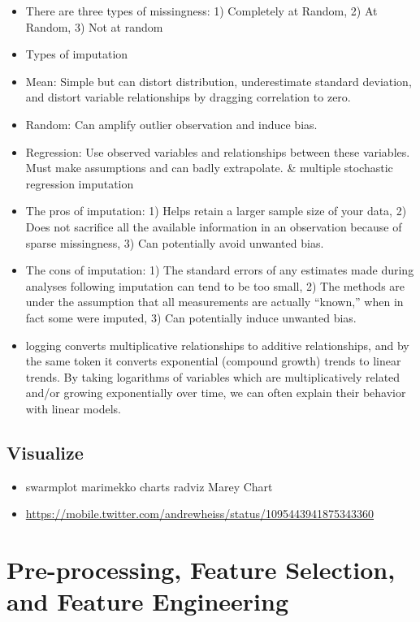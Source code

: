 \documentclass[]{book}
\begin{document}
\begin{itemize}
\item
  There are three types of missingness: 1) Completely at Random, 2) At
  Random, 3) Not at random
\item
  Types of imputation
\item
  Mean: Simple but can distort distribution, underestimate standard
  deviation, and distort variable relationships by dragging correlation
  to zero.
\item
  Random: Can amplify outlier observation and induce bias.
\item
  Regression: Use observed variables and relationships between these
  variables. Must make assumptions and can badly extrapolate. \&
  multiple stochastic regression imputation
\item
  The pros of imputation: 1) Helps retain a larger sample size of your
  data, 2) Does not sacrifice all the available information in an
  observation because of sparse missingness, 3) Can potentially avoid
  unwanted bias.
\item
  The cons of imputation: 1) The standard errors of any estimates made
  during analyses following imputation can tend to be too small, 2) The
  methods are under the assumption that all measurements are actually
  ``known,'' when in fact some were imputed, 3) Can potentially induce
  unwanted bias.
\item
  logging converts multiplicative relationships to additive
  relationships, and by the same token it converts exponential (compound
  growth) trends to linear trends. By taking logarithms of variables
  which are multiplicatively related and/or growing exponentially over
  time, we can often explain their behavior with linear models.
\end{itemize}

\section{Visualize}\label{visualize-1}

\begin{itemize}
\item
  swarmplot \textbar{} marimekko charts \textbar{} radviz \textbar{}
  Marey Chart
\item
  \url{https://mobile.twitter.com/andrewheiss/status/1095443941875343360}
\end{itemize}

\chapter{Pre-processing, Feature Selection, and Feature
Engineering}\label{pre-processing-feature-selection-and-feature-engineering}
\end{document}
